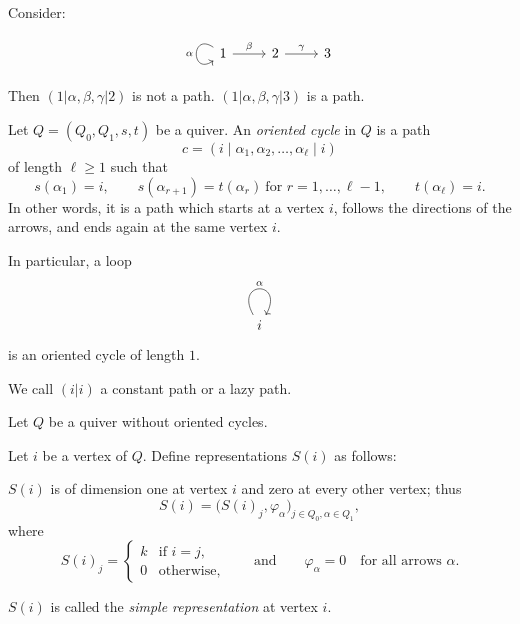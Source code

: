 \documentclass[11pt, a4paper]{report}
\begin{document}
\begin{example}
    Consider:
    \[
        \begin{tikzcd}
            1 \arrow[r, "\beta"] \arrow["\alpha"', loop, distance=2em, in=215, out=145] & 2 \arrow[r, "\gamma"] & 3
        \end{tikzcd}
    \]
    Then $(1 | \alpha, \beta,\gamma | 2)$ is not a path. $(1 | \alpha, \beta,\gamma | 3)$ is a path.
\end{example}

\begin{definition}
    Let \(Q=(Q_0,Q_1,s,t)\) be a quiver.
    An \emph{oriented cycle} in \(Q\) is a path
    \[
        c=(i \mid \alpha_1,\alpha_2,\ldots,\alpha_\ell \mid i)
    \]
    of length \(\ell \ge 1\) such that
    \[
        s(\alpha_1)=i,\qquad
        s(\alpha_{r+1})=t(\alpha_r)\ \text{for } r=1,\dots,\ell-1,\qquad
        t(\alpha_\ell)=i.
    \]
    In other words, it is a path which starts at a vertex \(i\), follows the directions
    of the arrows, and ends again at the same vertex \(i\).

    In particular, a loop
    \[
        \begin{tikzcd}
            i \arrow[out=120,in=60,loop, "\alpha"]
        \end{tikzcd}
    \]
    is an oriented cycle of length \(1\).
\end{definition}

\begin{definition}
    We call $(i|i)$ a constant path or a lazy path.
\end{definition}

Let $Q$ be a quiver without oriented cycles.

\begin{definition}
    Let $i$ be a vertex of $Q$. Define representations $S(i)$
    as follows:

    $S(i)$ is of dimension one at vertex $i$ and zero at every other vertex; thus
    \[
        S(i)=\bigl(S(i)_j,\varphi_{\alpha}\bigr)_{j\in Q_0,\alpha\in Q_1},
    \]
    where
    \[
        S(i)_j=
        \begin{cases}
            k & \text{if } i=j,   \\
            0 & \text{otherwise},
        \end{cases}
        \qquad \text{and} \qquad
        \varphi_{\alpha}=0 \quad \text{for all arrows } \alpha.
    \]

    $S(i)$ is called the \emph{simple representation} at vertex $i$.
\end{definition}
\end{document}
